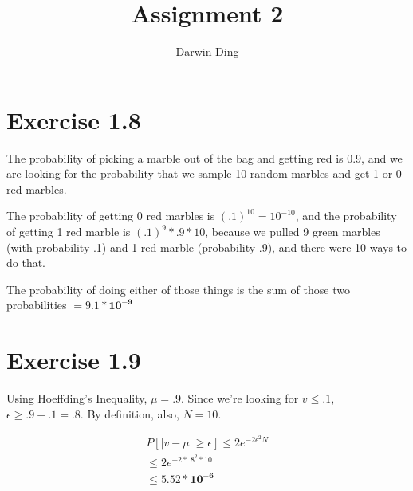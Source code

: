 \documentclass[12pt]{article}
\begin{document}
\title{Assignment 2}
\author{Darwin Ding}
\maketitle

\section*{Exercise 1.8}
The probability of picking a marble out of the bag and getting red is 0.9, and we are looking for the probability that we sample 10 random marbles and get 1 or 0 red marbles.

The probability of getting 0 red marbles is $(.1)^{10} = 10^{-10}$, and the probability of getting 1 red marble is $(.1)^9 * .9 * 10$, because we pulled 9 green marbles (with probability .1) and 1 red marble (probability .9), and there were 10 ways to do that.

The probability of doing either of those things is the sum of those two probabilities $= \boldsymbol{9.1 * 10^{-9}}$

\section*{Exercise 1.9}
Using Hoeffding's Inequality, $\mu = .9$. Since we're looking for $v \le .1$, $\epsilon \ge .9 - .1 = .8$. By definition, also, $N = 10$.

\begin{gather*}
P[|v - \mu| \ge \epsilon] \le 2e^{-2\epsilon^{2}N}
\\ \le 2e^{-2 * .8^2 * 10}
\\ \le \boldsymbol{5.52 * 10^{-6}}
\end{gather*}
\end{document}
